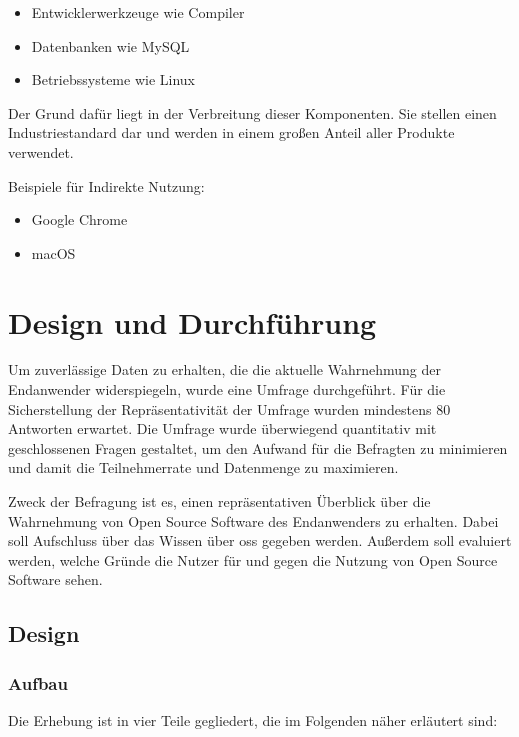 \documentclass[a4paper]{article}
\begin{document}
                    \begin{itemize}
                        \item Entwicklerwerkzeuge wie Compiler
                        \item Datenbanken wie MySQL
                        \item Betriebssysteme wie Linux 
                    \end{itemize}
                    Der Grund dafür liegt in der Verbreitung dieser Komponenten. Sie stellen einen Industriestandard dar und werden in einem großen Anteil aller Produkte verwendet.
                    
                    Beispiele für Indirekte Nutzung:
                    \begin{itemize}
                        \item Google Chrome
                        \item macOS
                    \end{itemize}

            
        
    \section{Design und Durchführung}
        Um zuverlässige Daten zu erhalten, die die aktuelle Wahrnehmung der Endanwender widerspiegeln, wurde eine Umfrage durchgeführt. Für die Sicherstellung der Repräsentativität der Umfrage wurden mindestens 80 Antworten erwartet.\label{section:fragestellung:answerAmount}
		Die Umfrage wurde überwiegend quantitativ mit geschlossenen Fragen gestaltet, um den Aufwand für die Befragten zu minimieren und damit die Teilnehmerrate und Datenmenge zu maximieren.  %
    
		Zweck der Befragung ist es, einen repräsentativen Überblick über die Wahrnehmung von Open Source Software des Endanwenders zu erhalten. Dabei soll Aufschluss über das Wissen über \gls{oss} gegeben werden. Außerdem soll evaluiert werden, welche Gründe die Nutzer für und gegen die Nutzung von Open Source Software sehen.
	
		\subsection{Design}
		  \subsubsection{Aufbau}
    			Die Erhebung ist in vier Teile gegliedert, die im Folgenden näher erläutert sind: 
    		   
\end{document}

